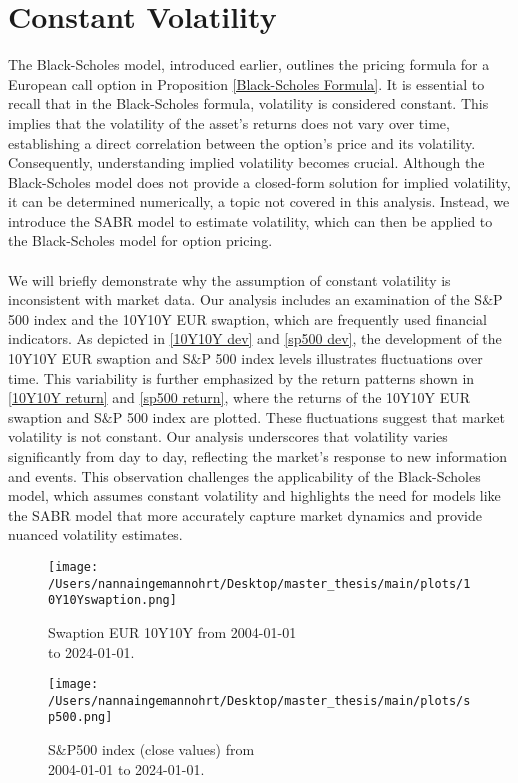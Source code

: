 \section{Constant Volatility}
The Black-Scholes model, introduced earlier, outlines the pricing formula for a European call option in 
Proposition \autoref{Black-Scholes Formula}. It is  essential to recall that in the Black-Scholes formula, 
volatility is considered constant. This implies that the volatility of the asset's returns does not vary over time,
establishing a direct correlation between the option's price and its volatility. Consequently, 
understanding implied volatility becomes crucial. Although the Black-Scholes model does not provide 
a closed-form solution for implied volatility, it can be determined numerically, a topic not covered 
in this analysis. Instead, we introduce the SABR model to estimate volatility, which can then be 
applied to the Black-Scholes model for option pricing.
\\\\
We will briefly demonstrate why the assumption of constant volatility is inconsistent with market data. 
Our analysis includes an examination of the S$\&$P 500 index and the 10Y10Y EUR swaption, which are frequently used 
financial indicators. As depicted in \autoref{10Y10Y dev} and \autoref{sp500 dev}, the development of the 10Y10Y EUR swaption 
and S$\&$P 500 index levels illustrates fluctuations over time. This variability is further emphasized by the return patterns 
shown in \autoref{10Y10Y return} and \autoref{sp500 return}, where the returns of the 10Y10Y EUR swaption and S$\&$P 500 index are plotted. 
These fluctuations suggest that market volatility is not constant. Our analysis underscores that volatility varies 
significantly from day to day, reflecting the market's response to new information and events. This observation challenges 
the applicability of the Black-Scholes model, which assumes constant volatility and highlights the need for models like the 
SABR model that more accurately capture market dynamics and provide nuanced volatility estimates.

\begin{figure}[h]
    \centering
    \begin{minipage}{0.5\textwidth}
        \texttt{[image: /Users/nannaingemannohrt/Desktop/master\_thesis/main/plots/10Y10Yswaption.png]}
        \caption{Swaption EUR 10Y10Y from  2004-01-01 \\ to 2024-01-01.}
        \label{10Y10Y dev}
    \end{minipage}\hfill 
    \begin{minipage}{0.5\textwidth}
        \texttt{[image: /Users/nannaingemannohrt/Desktop/master\_thesis/main/plots/sp500.png]}
        \caption{S$\&$P500 index (close values) from \\ 2004-01-01 to 2024-01-01.}
        \label{sp500 dev}
    \end{minipage}
\end{figure}

